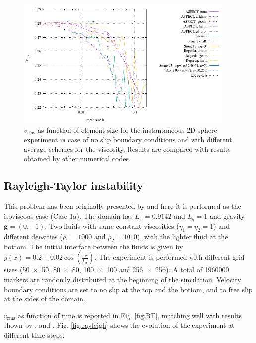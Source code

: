 \documentclass[hidelinks,10pt,a4paper]{article}
\begin{document}
\begin{figure}
\centering
\noindent\includegraphics[width=400px]{./Figures/vrms_NS.pdf}
\caption{$v_{\textrm{rms}}$ as function of element size for the instantaneous 2D sphere experiment in case of no slip boundary conditions and with different average
schemes for the viscosity. Results are compared with results obtained by other numerical codes.}
\label{fig:inst_sphere}
\end{figure}

\subsection{Rayleigh-Taylor instability}\label{sec:rayleigh}
This problem has been originally presented by \citet{vanKeken1997} and here it is performed as the isoviscous case (Case 1a). The domain has $L_x=0.9142$ and
$L_y=1$ and gravity $\bm{g}=(0,-1)$. Two fluids with same constant viscosities ($\eta_1=\eta_2=1$) and different densities ($\rho_1=1000$ and $\rho_2=1010$),
with the lighter fluid at the bottom. The initial interface between the fluids is given by $y(x)=0.2+0.02 \cos \left(\frac{\pi x}{L_x}\right)$. The experiment
is performed with different grid sizes (\num{50x50}, \num{80x80}, \num{100x100} and \num{256x256}). A total of 1960000 markers are randomly distributed at the
beginning of the simulation. Velocity boundary conditions are set to no slip at the top and the bottom, and to free slip at the sides of the domain.

$v_{\textrm{rms}}$ as function of time is reported in Fig. \ref{fig:RT}, matching well with results shown by \citet{vanKeken1997}, \citet{Tackley2003} and
\citet{Thieulot2014}. Fig. \ref{fig:rayleigh} shows the evolution of the experiment at different time steps.
\end{document}
